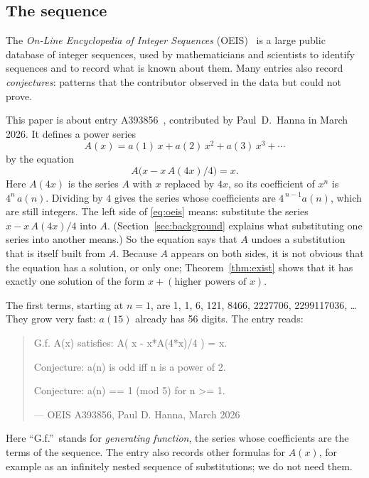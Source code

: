 \documentclass[11pt,a4paper]{article}
\theoremstyle{definition}
\theoremstyle{remark}
\begin{document}
\subsection{The sequence}\label{sec:sequence}
The \emph{On-Line Encyclopedia of Integer Sequences} (OEIS)~\cite{oeisdb} is a large public database of integer
sequences, used by mathematicians and scientists to identify sequences and to record what is known about them. Many
entries also record \emph{conjectures}: patterns that the contributor observed in the data but could not prove.

This paper is about entry A393856~\cite{oeis}, contributed by Paul~D.~Hanna in March 2026. It defines a power series
\[
A(x)=a(1)\,x+a(2)\,x^2+a(3)\,x^3+\cdots
\]
by the equation
\begin{equation}\label{eq:oeis}
A\bigl(x-x\,A(4x)/4\bigr)=x.
\end{equation}
Here $A(4x)$ is the series $A$ with $x$ replaced by $4x$, so its coefficient of $x^n$ is
$4^n\,a(n)$. Dividing by $4$ gives the series whose coefficients are
$4^{\,n-1}a(n)$, which are still integers. The left side of \eqref{eq:oeis} means: substitute the series
$x-x\,A(4x)/4$ into $A$. (Section~\ref{sec:background} explains what substituting one
series into another means.) So the equation says that $A$ undoes a substitution that is itself built from $A$. Because
$A$ appears on both sides, it is not obvious that the equation has a solution, or only one; Theorem~\ref{thm:exist}
shows that it has exactly one solution of the form $x+(\text{higher powers of }x)$.

The first terms, starting at $n=1$, are 1, 1, 6, 121, 8466, 2227706, 2299117036, \dots{} They grow very fast: $a(15)$
already has 56 digits. The entry reads:
\begin{quote}\small\ttfamily\raggedright G.f. A(x) satisfies: A( x - x*A(4*x)/4 ) = x.\par\smallskip Conjecture: a(n) is odd iff n is a power of 2.\par\smallskip Conjecture: a(n) == 1 (mod 5) for n >= 1.\par\smallskip\hfill\textrm{--- OEIS A393856, Paul D. Hanna, March 2026}\end{quote}

Here ``G.f.''\ stands for \emph{generating function}, the series whose coefficients are the terms of the sequence.
The entry also records other formulas for $A(x)$, for example as an infinitely nested sequence of substitutions; we do
not need them.
\end{document}
